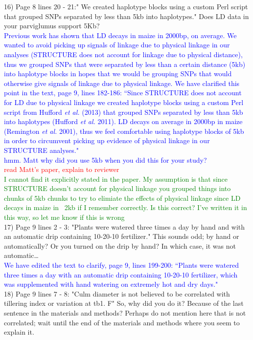 \documentclass[11pt]{article}
\newcommand{\res}[1]{\noindent \textcolor{blue}{{#1}} \\}
\newcommand{\jri}[1]{\noindent \textcolor{red}{{#1}} \\}
\newcommand{\lev}[1]{\noindent \textcolor{green}{{#1}} \\}
\begin{document}
16) Page 8 lines 20 - 21:" We created haplotype blocks using a custom Perl script that grouped SNPs separated by less than 5kb into haplotypes." Does LD data in your parviglumus support 5Kb?\\ 

\res{Previous work has shown that LD decays in maize in 2000bp, on average. We wanted to avoid picking up signals of linkage due to physical linkage in our analyses  (STRUCTURE does not account for linkage due to physical distance), thus we grouped SNPs that were separated by less than a certain distance (5kb) into haplotype blocks in hopes that we would be grouping SNPs that would otherwise give signals of linkage due to physical linkage. We have clarified this point in the text, page 9, lines 182-186: ``Since STRUCTURE does not account for LD due to physical linkage we created haplotype blocks using a custom Perl script from Hufford \emph{et al.} (2013) that grouped SNPs separated by less than 5kb into haplotypes (Hufford \emph{et al.} 2011). LD decays on average in 2000bp in maize (Remington \emph{et al.} 2001), thus we feel comfortable using haplotype blocks of 5kb in order to circumvent picking up evidence of physical linkage in our STRUCTURE analyses."}  
 
\res{hmm. Matt why did you use 5kb when you did this for your study?}
\jri{read Matt's paper, explain to reviewer}
\lev{I cannot find it explicitly stated in the paper. My assumption is that since STRUCTURE doesn't account for physical linkage you grouped things into chunks of 5kb chunks to try to elimiate the effects of physical linkage since LD decays in maize in ~2kb if I remember correctly. Is this correct? I've written it in this way, so let me know if this is wrong} 

17) Page 9 lines 2 - 3: "Plants were watered three times a day by hand and with an automatic drip containing 10-20-10 fertilizer." This sounds odd; by hand or automatically? Or you turned on the drip by hand? In which case, it was not automatic… \\

\res{We have edited the text to clarify, page 9, lines 199-200: ``Plants were watered three times a day with an automatic drip containing 10-20-10 fertilizer, which was supplemented with hand watering on extremely hot and dry days."}

18) Page 9 lines 7 - 8: "Culm diameter is not believed to be correlated with tillering index or variation at tb1. F" So, why did you do it? Because of the last sentence in the materials and methods? Perhaps do not mention here that is not correlated; wait until the end of the materials and methods where you seem to explain it.\\ 
\end{document}
